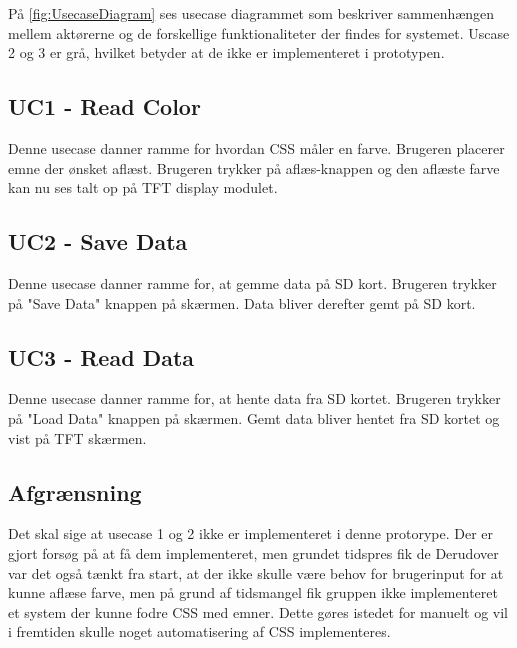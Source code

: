 På \autoref{fig:UsecaseDiagram} ses usecase diagrammet som beskriver sammenhængen mellem aktørerne og de forskellige funktionaliteter der findes for systemet. Uscase 2 og 3 er grå, hvilket betyder at de ikke er implementeret i prototypen. 

\subsection{UC1 - Read Color}
Denne usecase danner ramme for hvordan CSS måler en farve. Brugeren placerer emne der ønsket aflæst. Brugeren trykker på aflæs-knappen og den aflæste farve kan nu ses talt op på TFT display modulet.

\subsection{UC2 - Save Data}
Denne usecase danner ramme for, at gemme data på SD kort. Brugeren trykker på "Save Data" knappen på skærmen. Data bliver derefter gemt på SD kort.

\subsection{UC3 - Read Data}
Denne usecase danner ramme for, at hente data fra SD kortet. Brugeren trykker på "Load Data" knappen på skærmen. Gemt data bliver hentet fra SD kortet og vist på TFT skærmen.

\subsection{Afgrænsning}
Det skal sige at usecase 1 og 2 ikke er implementeret i denne protorype. Der er gjort forsøg på at få dem implementeret, men grundet tidspres fik de  Derudover var det også tænkt fra start, at der ikke skulle være behov for brugerinput for at kunne aflæse farve, men på grund af tidsmangel fik gruppen ikke implementeret et system der kunne fodre CSS med emner. Dette gøres istedet for manuelt og vil i fremtiden skulle noget automatisering af CSS implementeres.

